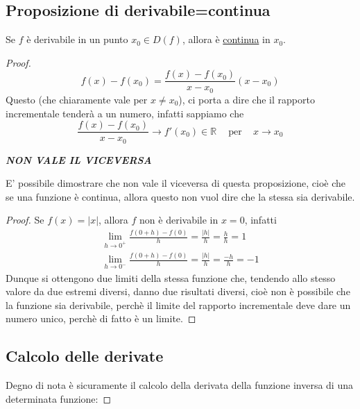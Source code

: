 \documentclass{article}
\theoremstyle{definition}
\begin{document}
\subsection{Proposizione di derivabile=continua}
Se $f$ è derivabile in un punto $x_0 \in D(f)$, allora è \underline{continua} in $x_0$.
\\
\begin{proof}
    \begin{equation*}
        f(x)-f(x_0)=\frac{f(x)-f(x_0)}{x-x_0}(x-x_0)
    \end{equation*}
    Questo (che chiaramente vale per $x \neq x_0$), ci porta a dire che il rapporto incrementale tenderà a un numero, infatti sappiamo che
    \begin{equation*}
        \frac{f(x)-f(x_0)}{x-x_0} \to f'(x_0) \in \mathbb{R} \,\,\,\,\,\,\ \mbox{per} \,\,\,\,\,\,\, x \to x_0
    \end{equation*}
    \begin{center}
        \textbf{\textit{NON VALE IL VICEVERSA}}
    \end{center}
E' possibile dimostrare che non vale il viceversa di questa proposizione, cioè che se una funzione è continua, allora questo non vuol dire che la stessa sia derivabile.
\\
\begin{proof}
    Se $f(x)=|x|$, allora $f$ non è derivabile in $x=0$, infatti
    \begin{align*}
        \lim_{h \to 0^+}\frac{f(0+h)-f(0)}{h}=\frac{|h|}{h}=\frac{h}{h}=1 \\
         \lim_{h \to 0^-}\frac{f(0+h)-f(0)}{h}=\frac{|h|}{h}= \frac{-h}{h}=-1
    \end{align*}
    Dunque si ottengono due limiti della stessa funzione che, tendendo allo stesso valore da due estremi diversi, danno due risultati diversi, cioè non è possibile che la funzione sia derivabile, perchè il limite del rapporto incrementale deve dare un numero unico, perchè di fatto è un limite.
\end{proof}
\subsection{Calcolo delle derivate}
Degno di nota è sicuramente il calcolo della derivata della funzione inversa di una determinata funzione:

\end{proof}
\end{document}
